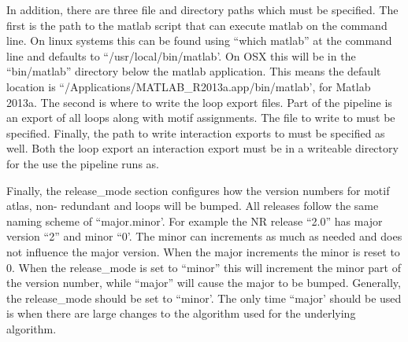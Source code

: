 In addition, there are three file and directory paths which must be specified.
The first is the path to the matlab script that can execute matlab on the
command line. On linux systems this can be found using ``which matlab'' at the
command line and defaults to ``/usr/local/bin/matlab'. On OSX this will be in the
``bin/matlab'' directory below the matlab application. This means the default
location is ``/Applications/MATLAB\_R2013a.app/bin/matlab', for Matlab 2013a. The
second is where to write the loop export files. Part of the pipeline is an
export of all loops along with motif assignments. The file to write to must be
specified. Finally, the path to write interaction exports to must be specified
as well. Both the loop export an interaction export must be in a writeable
directory for the use the pipeline runs as.

Finally, the release\_mode section configures how the version numbers for motif
atlas, non- redundant and loops will be bumped. All releases follow the same
naming scheme of ``major.minor'. For example the NR release ``2.0'' has major
version ``2'' and minor ``0'. The minor can increments as much as needed and does
not influence the major version. When the major increments the minor is reset to
0. When the release\_mode is set to ``minor'' this will increment the minor part
of the version number, while ``major'' will cause the major to be bumped.
Generally, the release\_mode should be set to ``minor'. The only time ``major'
should be used is when there are large changes to the algorithm used for the
underlying algorithm.

